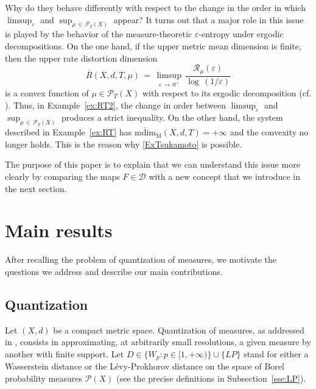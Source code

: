 \documentclass[11pt,a4paper,reqno]{amsart}
\theoremstyle{plain}
\theoremstyle{definition}
\newcommand{\ep} {\varepsilon}
\newcommand{\vep}{\varepsilon}
\newcommand{\cP}{{\mathcal P}}
\newcommand{\cD}{{\mathcal D}}
\begin{document}
\smallskip

Why do they behave differently with respect to the change in the order in which $\limsup_\ep$ and $\sup_{\mu\,\in\,\cP_T(X)}$ appear? It turns out that a major role in this issue is played by the behavior of the measure-theoretic $\vep$-entropy under ergodic decompositions. On the one hand, if the upper metric mean dimension is finite, then the upper rate distortion dimension
$$\overline{R}(X,d,T,\mu)\, = \, \limsup_{\vep \, \to \, 0^+}\,  \frac{\mathcal{R}_{\mu}(\varepsilon)}{\log\,(1/\varepsilon)}$$
is a convex function of $\mu \in \mathcal{P}_T(X)$ with respect to its ergodic decomposition (cf. \cite[Theorem~1.1]{Tsu2025}). Thus, in Example~\ref{ex:RT2}, the change in order between $\limsup_\ep$ and $\sup_{\mu\,\in\,\cP_T(X)}$ produces a strict inequality. On the other hand, the system described in Example~\ref{ex:RT} has $\mathrm{\overline{mdim}_M}(X,d,T) = +\infty$ and the convexity no longer holds. This is the reason why \eqref{ExTsukamoto} is possible.
\smallskip


The purpose of this paper is to explain that we can understand this issue more clearly by comparing the maps $F \in \cD$ with a new concept that we introduce in the next section.

\section{Main results}

After recalling the problem of quantization of measures, we motivate the questions we address and describe our main contributions.

\subsection{Quantization}\label{ex:Q}

Let $(X,d)$ be a compact metric space. Quantization of measures, as addressed in \cite{GL}, consists in approximating, at arbitrarily small resolutions, a given measure by another with finite support. Let $D \in \{W_p\colon p \in [1,+\infty)\}\cup \{LP\}$ stand for either a Wasserstein distance or the L\'evy-Prokhorov distance on the space of Borel probability measures $\cP(X)$ (see the precise definitions in Subsection~\ref{sse:LP}).
\end{document}
